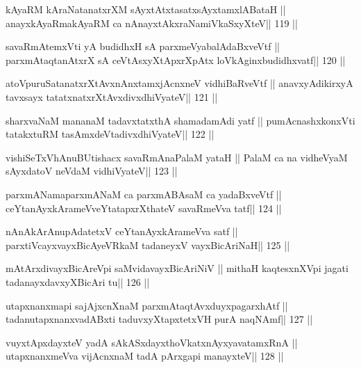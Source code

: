 \begin{shl}
kAyaRM kAraNatanatxrXM sAyxtAtxtasatxsAyx\s\s tamxlABataH ||
anayxkAyaRmakAyaRM ca nAnayxtAkxraNamiVkaSxyXteV\hfill || 119 ||
\end{shl}

\begin{shl}
savaRmAtemxVti yA budidhxH sA parxmeVyabalAdaBxveVtf ||
parxmAtaqtanAtxrX sA ceVtAsxyXtApxrXpAtx loVkAginxbudidhxvatf\hfill || 120 ||
\end{shl}

\begin{shl}
atoV\s puruSatanatxrXtAvxnAnx\s\s tamxjAcnxneV vidhiBaRveVtf ||
anavxyAdikirxyA tavxsayx tatatxnatxrXtAvxdivxdhiVyateV\hfill || 121 ||
\end{shl}

\begin{shl}
sharxvaNaM mananaM tadavxtatxthA shamadamAdi yatf ||
pumAcnashxkonxVti tatakxtuRM tasAmxdeVtadivxdhiVyateV\hfill || 122 ||
\end{shl}

\begin{shl}
vishiSeTxVhAnuBUtishacx savaRmAnaPalaM yataH ||
PalaM ca na vidheVyaM sAyxdatoV neVdaM vidhiVyateV\hfill || 123 ||
\end{shl}

\begin{shl}
parxmANamaparxmANaM ca parxmABAsaM ca yadaBxveVtf ||
ceYtanAyxkArameVveYtatapxrXthateV savaRmeVva tatf\hfill || 124 ||
\end{shl}

\begin{shl}
nAnAkArAnupAdatetxV ceYtanAyxkArameVva satf ||
parxtiVcayxvayxBicAyeVRkaM tadaneyxV vayxBicAriNaH\hfill || 125 ||
\end{shl}

\begin{shl}
mAtArxdivayxBicAreV\s pi saMvidavayxBicAriNiV ||
mithaH kaqtesxnXV\s pi jagati tadanayxdavxyXBicAri tu\hfill || 126 ||
\end{shl}

\begin{shl}
utapxnanxmapi sajAjxcnXnaM parxmAtaqtAvxduyxpagarxhAtf ||
tadanutapxnanxvadABxti taduvxyXtapxtetxVH purA naqNAmf\hfill || 127 ||
\end{shl}

\begin{shl}
vuyxtApxdayxteV yadA sAkASxdayxthoVkatxnAyxyavatamxRnA ||
utapxnanxmeVva vijAcnxnaM tadA pArxgapi manayxteV\hfill || 128 ||
\end{shl}


